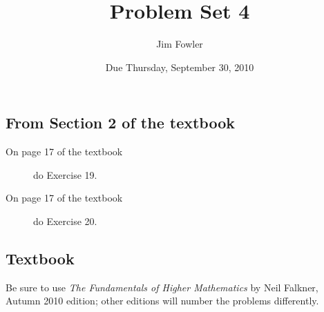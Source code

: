 \documentclass[12pt]{handout}
\author{Jim Fowler}
\title{Problem Set 4}
\date{Due Thursday, September 30, 2010}
\begin{document}
\maketitle










\subsection*{From Section 2 of the textbook}



\begin{description}

\item[On page 17 of the textbook] do Exercise 19.

\item[On page 17 of the textbook] do Exercise 20.

\end{description}











\subsection*{Textbook}
Be sure to use \textit{The Fundamentals of Higher Mathematics} by Neil Falkner, Autumn 2010 edition; other editions will number the problems differently.
\end{document}

